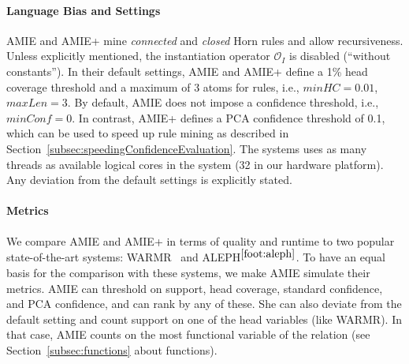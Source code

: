 \paragraph{Language Bias and Settings} 
AMIE and AMIE+ mine \emph{connected} and \emph{closed} Horn rules and allow recursiveness.
Unless explicitly mentioned, the instantiation operator $\mathcal{O}_I$ is disabled (``without constants'').
In their default settings, AMIE and AMIE+ define a 1\% head coverage threshold and a maximum of 3 atoms for rules, i.e., $minHC=0.01$, $maxLen=3$. 
By default, AMIE does not impose a confidence threshold, i.e., $minConf=0$. In contrast, AMIE+ defines a PCA confidence threshold of 0.1, which
can be used to speed up rule mining as described in Section~\ref{subsec:speedingConfidenceEvaluation}.
The systems uses as many threads as available logical cores in the system (32 in our hardware platform).
Any deviation from the default settings is explicitly stated.


\paragraph{Metrics}
We compare AMIE and AMIE+ in terms of quality and runtime to two popular state-of-the-art systems:
WARMR~\cite{DehToi99,DehToi00} and ALEPH$^{\ref{foot:aleph}}$.
To have an equal basis for the comparison with these systems, we make AMIE
simulate their metrics.
AMIE can threshold on support, head coverage, standard confidence, and PCA confidence, and can rank by any of these.
She can also deviate from the default setting and count support on one of the head variables (like WARMR).
In that case, AMIE counts on the most functional variable of the relation (see Section~\ref{subsec:functions} about functions).


